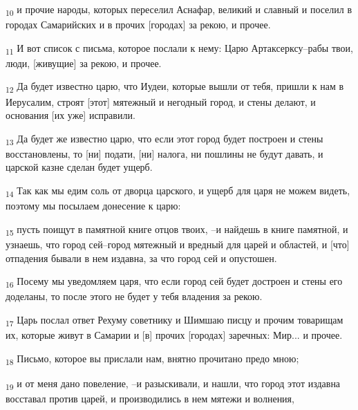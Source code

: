\begin{tcolorbox}
\textsubscript{10} и прочие народы, которых переселил Аснафар, великий и славный и поселил в городах Самарийских и в прочих [городах] за рекою, и прочее.
\end{tcolorbox}
\begin{tcolorbox}
\textsubscript{11} И вот список с письма, которое послали к нему: Царю Артаксерксу--рабы твои, люди, [живущие] за рекою, и прочее.
\end{tcolorbox}
\begin{tcolorbox}
\textsubscript{12} Да будет известно царю, что Иудеи, которые вышли от тебя, пришли к нам в Иерусалим, строят [этот] мятежный и негодный город, и стены делают, и основания [их уже] исправили.
\end{tcolorbox}
\begin{tcolorbox}
\textsubscript{13} Да будет же известно царю, что если этот город будет построен и стены восстановлены, то [ни] подати, [ни] налога, ни пошлины не будут давать, и царской казне сделан будет ущерб.
\end{tcolorbox}
\begin{tcolorbox}
\textsubscript{14} Так как мы едим соль от дворца царского, и ущерб для царя не можем видеть, поэтому мы посылаем донесение к царю:
\end{tcolorbox}
\begin{tcolorbox}
\textsubscript{15} пусть поищут в памятной книге отцов твоих, --и найдешь в книге памятной, и узнаешь, что город сей--город мятежный и вредный для царей и областей, и [что] отпадения бывали в нем издавна, за что город сей и опустошен.
\end{tcolorbox}
\begin{tcolorbox}
\textsubscript{16} Посему мы уведомляем царя, что если город сей будет достроен и стены его доделаны, то после этого не будет у тебя владения за рекою.
\end{tcolorbox}
\begin{tcolorbox}
\textsubscript{17} Царь послал ответ Рехуму советнику и Шимшаю писцу и прочим товарищам их, которые живут в Самарии и [в] прочих [городах] заречных: Мир... и прочее.
\end{tcolorbox}
\begin{tcolorbox}
\textsubscript{18} Письмо, которое вы прислали нам, внятно прочитано предо мною;
\end{tcolorbox}
\begin{tcolorbox}
\textsubscript{19} и от меня дано повеление, --и разыскивали, и нашли, что город этот издавна восставал против царей, и производились в нем мятежи и волнения,
\end{tcolorbox}
